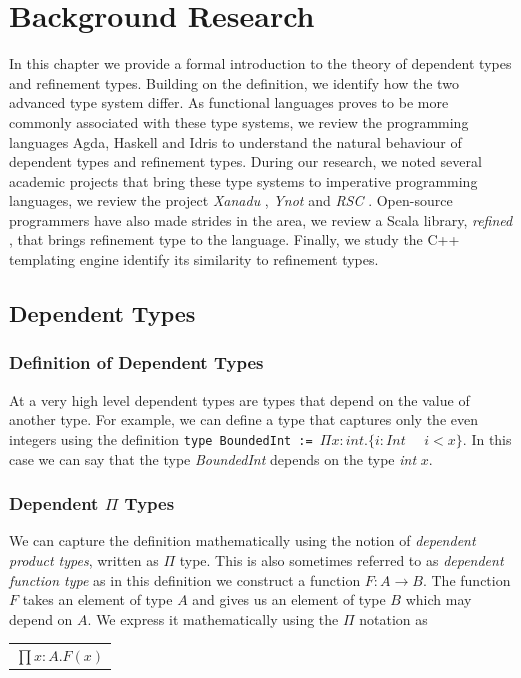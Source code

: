 \documentclass[a4paper,12pt]{report}
\begin{document}
\chapter{Background Research} \label{chapter:background}
In this chapter we provide a formal introduction to the theory of dependent 
types and refinement types. Building on the definition, we identify how the two 
advanced type system differ. As functional languages proves to be more 
commonly associated with these type systems, we review the programming languages 
Agda, Haskell and Idris to understand the natural behaviour of dependent types 
and refinement types. During our research, we noted several academic projects  
that bring these type systems to imperative programming languages, we review 
the project \textit{Xanadu} \cite{xanadu}, \textit{Ynot} \cite{ynot} and 
\textit{RSC} \cite{rts}. Open-source programmers have also made strides in 
the area, we review a Scala library, \textit{refined} \cite{refinedScala}, 
that brings refinement type to the language. Finally, we study the C++ 
templating engine identify its similarity to refinement types. 

\section{Dependent Types}
\subsection{Definition of Dependent Types}
At a very high level dependent types are types that depend on the value of 
another type. For example, we can define a type that captures only the even 
integers using the definition 
\verb|type BoundedInt := |$\Pi x : int.\{i : Int\text{ }\text{ } i < x\}$. 
In this case we can say that the type \textit{BoundedInt} depends on the 
type \textit{int} $x$.

\subsection{Dependent $\Pi$ Types}
We can capture the definition mathematically using the notion of \textit{dependent 
product types}, written as $\Pi$ type. This is also sometimes referred to as 
\textit{dependent function type} as in this definition we construct a function 
$F: A \rightarrow B$. The function $F$ takes an element of type $A$ and 
gives us an element of type $B$ which may depend on $A$. We express it 
mathematically using the $\Pi$ notation as
\begin{center}
 \begin{tabular}{l}
   $\prod x: A.  F(x)$
 \end{tabular} 
\end{center}
\end{document}

